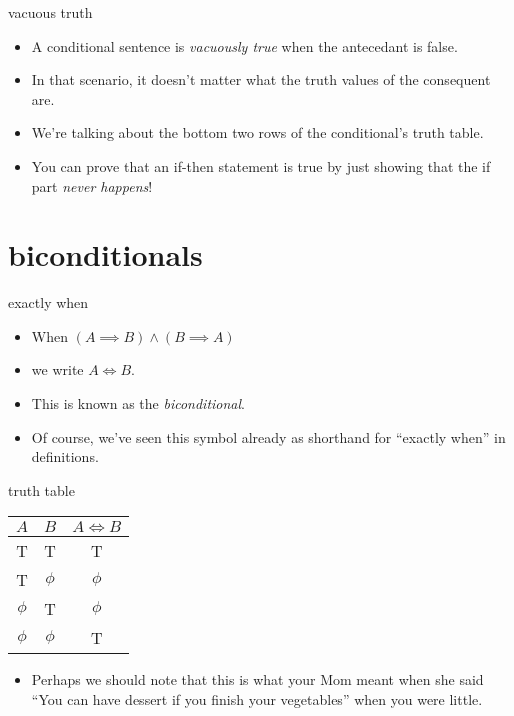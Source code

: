 \documentclass[landscape]{beamer}
\begin{document}
\begin{frame}{vacuous truth}
\begin{itemize}
\item A conditional sentence is {\em vacuously true} when the antecedant is false. \pause
\item In that scenario, it doesn't matter what the truth values of the consequent are. \pause
\item We're talking about the bottom two rows of the conditional's truth table. \pause
\item You can prove that an if-then statement is true by just showing that the if part {\em never happens}!
\end{itemize}
\end{frame}

\section{biconditionals}

\begin{frame}{exactly when}
\begin{itemize}
\item When $ (A \implies B) \land (B \implies A) $ \pause
\item we write $A \iff B$. \pause
\item This is known as the {\em biconditional}.\pause
\item Of course, we've seen this symbol already as shorthand for ``exactly when'' in definitions.
\end{itemize}
\end{frame}

\begin{frame}{truth table}
\begin{center}
\begin{tabular}{c|c||c}
$A$ & $B$ & $A \iff B$ \\ \hline
T & T & T \\
T & $\phi$ & $\phi$ \\
 $\phi$ & T & $\phi$ \\
 $\phi$ & $\phi$ & T \\
\end{tabular}
\end{center}
\pause
\begin{itemize}
\item Perhaps we should note that this is what your Mom meant when she said \newline
``You can have dessert if you finish your vegetables'' when you were little.
\end{itemize}

\end{frame}
\end{document}
